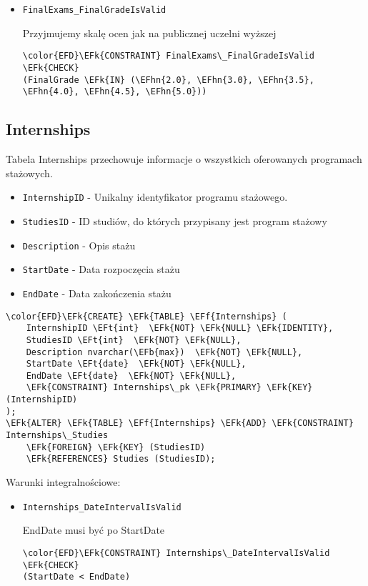 \documentclass[11pt]{article}
\newcommand{\EFk}[1]{\textcolor{EFk}{\textbf{#1}}} %
\newcommand{\EFb}[1]{\textcolor{EFb}{\textbf{#1}}} %
\newcommand{\EFf}[1]{\textcolor{EFf}{#1}} %
\newcommand{\EFt}[1]{\textcolor{EFt}{\textbf{#1}}} %
\newcommand{\EFhn}[1]{\textcolor{EFhn}{#1}} %
\begin{document}
\begin{itemize}
\item \texttt{FinalExams\_FinalGradeIsValid}

Przyjmujemy skalę ocen jak na publicznej uczelni wyższej
\begin{Code}
\begin{Verbatim}
\color{EFD}\EFk{CONSTRAINT} FinalExams\_FinalGradeIsValid \EFk{CHECK}
(FinalGrade \EFk{IN} (\EFhn{2.0}, \EFhn{3.0}, \EFhn{3.5}, \EFhn{4.0}, \EFhn{4.5}, \EFhn{5.0}))
\end{Verbatim}
\end{Code}
\end{itemize}
\subsection{Internships}
\label{sec:orge3a866a}
Tabela Internships przechowuje informacje o wszystkich oferowanych programach stażowych.
\begin{itemize}
\item \texttt{InternshipID} - Unikalny identyfikator programu stażowego.
\item \texttt{StudiesID} - ID studiów, do których przypisany jest program stażowy
\item \texttt{Description} - Opis stażu
\item \texttt{StartDate} - Data rozpoczęcia stażu
\item \texttt{EndDate} - Data zakończenia stażu
\end{itemize}
\begin{Code}
\begin{Verbatim}
\color{EFD}\EFk{CREATE} \EFk{TABLE} \EFf{Internships} (
    InternshipID \EFt{int}  \EFk{NOT} \EFk{NULL} \EFk{IDENTITY},
    StudiesID \EFt{int}  \EFk{NOT} \EFk{NULL},
    Description nvarchar(\EFb{max})  \EFk{NOT} \EFk{NULL},
    StartDate \EFt{date}  \EFk{NOT} \EFk{NULL},
    EndDate \EFt{date}  \EFk{NOT} \EFk{NULL},
    \EFk{CONSTRAINT} Internships\_pk \EFk{PRIMARY} \EFk{KEY}  (InternshipID)
);
\EFk{ALTER} \EFk{TABLE} \EFf{Internships} \EFk{ADD} \EFk{CONSTRAINT} Internships\_Studies
    \EFk{FOREIGN} \EFk{KEY} (StudiesID)
    \EFk{REFERENCES} Studies (StudiesID);
\end{Verbatim}
\end{Code}
Warunki integralnościowe:


\begin{itemize}
\item \texttt{Internships\_DateIntervalIsValid}

EndDate musi być po StartDate
\begin{Code}
\begin{Verbatim}
\color{EFD}\EFk{CONSTRAINT} Internships\_DateIntervalIsValid \EFk{CHECK}
(StartDate < EndDate)
\end{Verbatim}
\end{Code}
\end{itemize}
\end{document}
